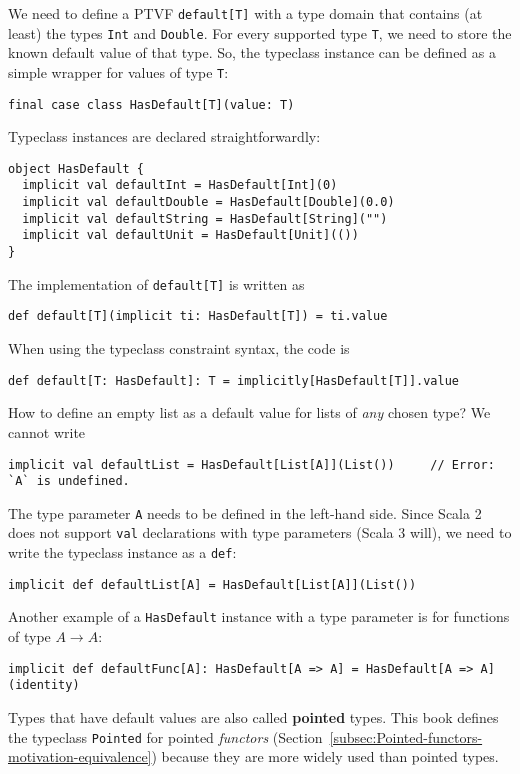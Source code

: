 We need to define a PTVF \lstinline!default[T]! with a type domain
that contains (at least) the types \lstinline!Int! and \lstinline!Double!.
For every supported type \lstinline!T!, we need to store the known
default value of that type. So, the typeclass instance can be defined
as a simple wrapper for values of type \lstinline!T!:
\begin{lstlisting}
final case class HasDefault[T](value: T)
\end{lstlisting}
Typeclass instances are declared straightforwardly:
\begin{lstlisting}
object HasDefault {
  implicit val defaultInt = HasDefault[Int](0)
  implicit val defaultDouble = HasDefault[Double](0.0)
  implicit val defaultString = HasDefault[String]("")
  implicit val defaultUnit = HasDefault[Unit](())
}
\end{lstlisting}
The implementation of \lstinline!default[T]! is written as
\begin{lstlisting}
def default[T](implicit ti: HasDefault[T]) = ti.value
\end{lstlisting}
When using the typeclass constraint syntax, the code is
\begin{lstlisting}
def default[T: HasDefault]: T = implicitly[HasDefault[T]].value
\end{lstlisting}

How to define an empty list as a default value for lists of \emph{any}
chosen type? We cannot write
\begin{lstlisting}
implicit val defaultList = HasDefault[List[A]](List())     // Error: `A` is undefined.
\end{lstlisting}
The type parameter \lstinline!A! needs to be defined in the left-hand
side. Since Scala 2 does not support \lstinline!val! declarations
with type parameters (Scala 3 will), we need to write the typeclass
instance as a \lstinline!def!:
\begin{lstlisting}
implicit def defaultList[A] = HasDefault[List[A]](List())
\end{lstlisting}

Another example of a \lstinline!HasDefault! instance with a type
parameter is for functions of type $A\rightarrow A$:
\begin{lstlisting}
implicit def defaultFunc[A]: HasDefault[A => A] = HasDefault[A => A](identity)
\end{lstlisting}

Types that have default values are also called \textbf{pointed}
types. This book defines the typeclass \lstinline!Pointed! for pointed
\emph{functors} (Section~\ref{subsec:Pointed-functors-motivation-equivalence})
because they are more widely used than pointed types.

